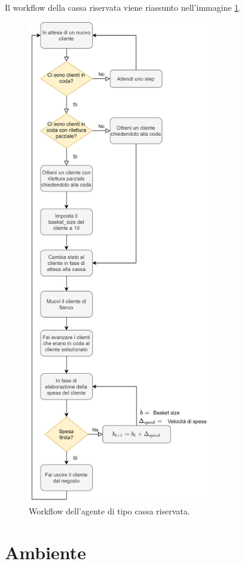 Il workflow della cassa riservata viene riassunto nell'immagine \ref{fig:workflow_cashdesk_reserved}.

\begin{figure}[H]
	\centering
	\includegraphics[width=8cm]{"images/workflow_cashdesk_reserved.png"}
	\caption{Workflow dell'agente di tipo cassa riservata.}
	\label{fig:workflow_cashdesk_reserved}
\end{figure}


\section{Ambiente}
\label{model:environment}

